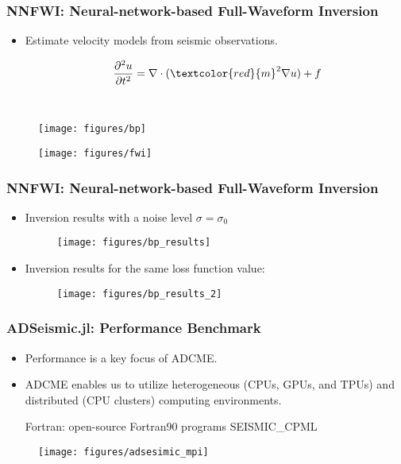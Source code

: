 \documentclass[usenames,dvipsnames]{beamer}
\begin{document}
\begin{frame}
	\frametitle{NNFWI: Neural-network-based Full-Waveform Inversion}
	
	\begin{itemize}
		\item Estimate velocity models from seismic observations. 
	\end{itemize}
	\begin{minipage}[t]{0.3\textwidth}
		\begin{equation*}
		\qquad\frac{\partial^2 u}{\partial t^2} = \nabla \cdot (\textcolor{red}{m}^2 \nabla u) + f
		\end{equation*}
	\end{minipage}~
	\begin{minipage}[t]{0.69\textwidth}
		\begin{figure}[hbt]
			\centering
			\texttt{[image: figures/bp]}
		\end{figure}
	\end{minipage}
	
	
	
	\begin{figure}[hbt]
		\texttt{[image: figures/fwi]}
	\end{figure}
\end{frame}

\begin{frame}
	\frametitle{NNFWI: Neural-network-based Full-Waveform Inversion}
	
	\begin{itemize}
		\item Inversion results with a noise level $\sigma = \sigma_0$
		\begin{figure}[hbt]
			\centering
			\texttt{[image: figures/bp\_results]}
		\end{figure}
		
		\item Inversion results for the same loss function value:
		\begin{figure}[hbt]
			\centering
			\texttt{[image: figures/bp\_results\_2]}
		\end{figure}
		
	\end{itemize}
	
\end{frame}

\begin{frame}
	\frametitle{ADSeismic.jl: Performance Benchmark}
	\begin{itemize}
		\item Performance is a key focus of ADCME.  
		\item ADCME enables us to utilize heterogeneous (CPUs, GPUs, and TPUs) and distributed (CPU clusters) computing environments.
		
		{\small Fortran: {open-source Fortran90 programs SEISMIC\_CPML}}
	\end{itemize}
	\begin{figure}[hbt]
		\texttt{[image: figures/adsesimic\_mpi]}
	\end{figure}
\end{frame}
\end{document}
